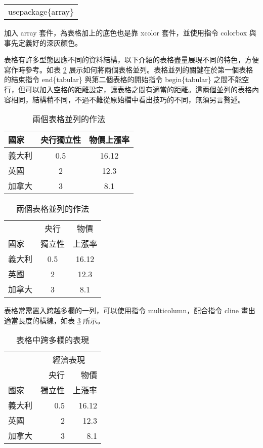 \begin{center}\colorbox{slight}{\begin{tabular}{p{}}
	{\A usepackage\{array\}}
\end{tabular}}\end{center}
\bigskip
加入 {\A array} 套件，為表格加上的底色也是靠 {\A xcolor} 套件，並使用指令 {\A colorbox} 與事先定義好的深灰顏色。

表格有許多型態因應不同的資料結構，以下介紹的表格盡量展現不同的特色，方便寫作時參考。如表 \ref{basic_two_table} 展示如何將兩個表格並列。表格並列的關鍵在於第一個表格的結束指令 {\A end\{tabular\}} 與第二個表格的開始指令 {\A begin\{tabular\}} 之間不能空行，但可以加入空格的距離設定，讓表格之間有適當的距離。這兩個並列的表格內容相同，結構稍不同，不過不難從原始檔中看出技巧的不同，無須另言贅述。

\begin{table}[h]
    \centering
    \caption{兩個表格並列的作法}\label{basic_two_table}
    \bigskip
    \extrarowheight=2pt
    \begin{tabular}{lcc}
    \hline
    國家       & 央行獨立性    & 物價上漲率 \\\hline
    義大利    & 0.5              & 16.12 \\
    英國       & 2                 & 12.3 \\
    加拿大    & 3                 & 8.1 \\\hline
    \end{tabular}\hspace{10pt}
    \begin{tabular}{lcc}
    \hline
                & 央行       & 物價 \\[-2pt]
    國家      & 獨立性    & 上漲率 \\\hline
    義大利   & 0.5        & 16.12 \\
    英國      & 2           & 12.3 \\
    加拿大   & 3           & 8.1 \\\hline
    \end{tabular}
\end{table}

表格常需置入跨越多欄的一列，可以使用指令 {\A multicolumn}，配合指令 {\A cline} 畫出適當長度的橫線，如表 \ref{basic_multi_col}  所示。

\begin{table}[h]
    \centering
    \caption{表格中跨多欄的表現}\label{basic_multi_col}
    \bigskip
    \extrarowheight=2pt
    \begin{tabular}{lrr}
    \hline
              & \multicolumn{2}{c}{經濟表現}\\\cline{2-3}%
              & 央行      & 物價 \\[-2pt]
    國家    & 獨立性   & 上漲率 \\\hline
    義大利 & 0.5       & 16.12 \\
    英國    & 2          & 12.3 \\
    加拿大 & 3          & 8.1 \\\hline
    \end{tabular}
\end{table}

